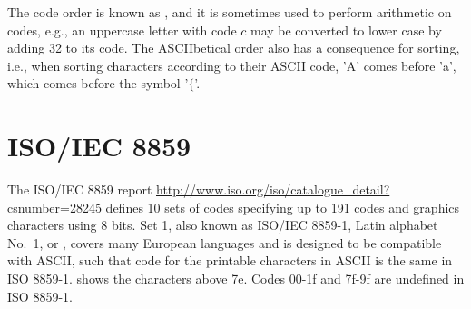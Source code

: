 \documentclass[fsharpnotes.tex]{subfiles}
\begin{document}
The code order is known as , and it is sometimes used to perform arithmetic on codes, e.g., an uppercase letter with code $c$ may be converted to lower case by adding 32 to its code. The ASCIIbetical order also has a consequence for sorting, i.e., when sorting characters according to their ASCII code, 'A' comes before 'a', which comes before the symbol '$\{$'.

\section{ISO/IEC 8859}
The ISO/IEC 8859 report \url{http://www.iso.org/iso/catalogue_detail?csnumber=28245} defines 10 sets of codes specifying up to 191 codes and graphics characters using 8 bits. Set 1, also known as ISO/IEC 8859-1, Latin alphabet No.\ 1, or , covers many European languages and is designed to be compatible with ASCII, such that code for the printable characters in ASCII is the same in ISO 8859-1.  shows the characters above 7e. Codes 00-1f and 7f-9f are undefined in ISO 8859-1. 
\end{document}

